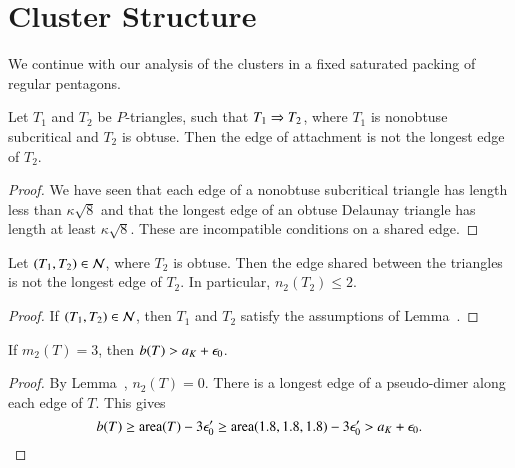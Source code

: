 \section{Cluster Structure}





We continue with our analysis of the clusters in a fixed saturated
packing of regular pentagons.  

\begin{lemma}  
Let $T_1$ and $T_2$ be $P$-triangles, such that $T_1\Rightarrow T_2$, where $T_1$ is nonobtuse subcritical and
  $T_2$ is obtuse.  Then the edge of attachment is not the longest
  edge of $T_2$.
\end{lemma}

\begin{proof} We have seen that each edge of a nonobtuse subcritical
  triangle has length less than $\kappa\sqrt8$ and that the longest edge of an
  obtuse Delaunay triangle has length at least $\kappa\sqrt{8}$.  These are
  incompatible conditions on a shared edge.
\end{proof}

\begin{lemma}  
  Let $(T_1,T_2)\in\mathcal N$, where $T_2$ is obtuse.  Then the edge shared between the triangles is
  not the longest edge of $T_2$.  In particular, $n_2(T_2)\le 2$.
\end{lemma}

\begin{proof} If $(T_1,T_2)\in \mathcal N$, then $T_1$ and $T_2$ satisfy the
  assumptions of Lemma~.
\end{proof}

\begin{lemma} 
If $m_2(T) = 3$, then $b(T) > a_K + \epsilon_0$.
\end{lemma}

\begin{proof}  By Lemma~, $n_2(T)=0$.
There is a longest edge of a pseudo-dimer along each edge of $T$.
This gives
\[
b(T) \ge {\operatorname{area}}(T) - 3\epsilon_0' \ge {\operatorname{area}}(1.8,1.8,1.8) - 3\epsilon_0' > a_K + \epsilon_0.
\]
\end{proof}

